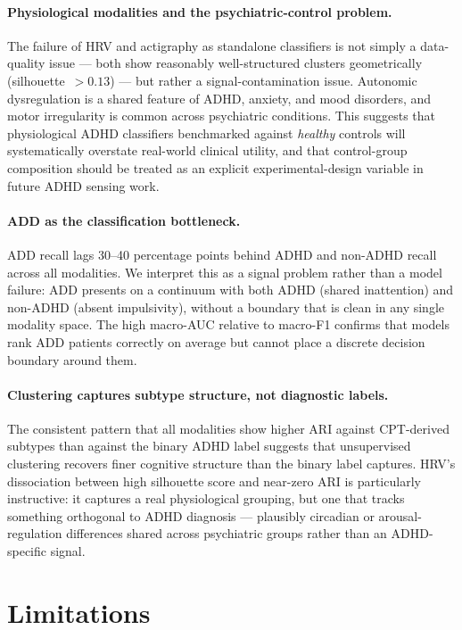 \documentclass[11pt]{article}
\begin{document}
\paragraph{Physiological modalities and the psychiatric-control problem.} The failure of HRV and actigraphy as standalone classifiers is not simply a data-quality issue --- both show reasonably well-structured clusters geometrically (silhouette~$>0.13$) --- but rather a signal-contamination issue. Autonomic dysregulation is a shared feature of ADHD, anxiety, and mood disorders, and motor irregularity is common across psychiatric conditions. This suggests that physiological ADHD classifiers benchmarked against \emph{healthy} controls will systematically overstate real-world clinical utility, and that control-group composition should be treated as an explicit experimental-design variable in future ADHD sensing work.

\paragraph{ADD as the classification bottleneck.} ADD recall lags 30--40 percentage points behind ADHD and non-ADHD recall across all modalities. We interpret this as a signal problem rather than a model failure: ADD presents on a continuum with both ADHD (shared inattention) and non-ADHD (absent impulsivity), without a boundary that is clean in any single modality space. The high macro-AUC relative to macro-F1 confirms that models rank ADD patients correctly on average but cannot place a discrete decision boundary around them.

\paragraph{Clustering captures subtype structure, not diagnostic labels.} The consistent pattern that all modalities show higher ARI against CPT-derived subtypes than against the binary ADHD label suggests that unsupervised clustering recovers finer cognitive structure than the binary label captures. HRV's dissociation between high silhouette score and near-zero ARI is particularly instructive: it captures a real physiological grouping, but one that tracks something orthogonal to ADHD diagnosis --- plausibly circadian or arousal-regulation differences shared across psychiatric groups rather than an ADHD-specific signal.

\section{Limitations}
\label{sec:limitations}
\end{document}
